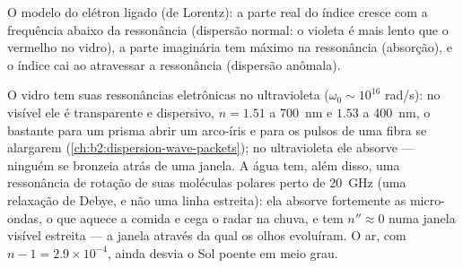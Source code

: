 \begin{omfigure}

{\small O modelo do elétron ligado (de Lorentz): a parte real do índice
cresce com a frequência abaixo da ressonância (dispersão normal: o violeta
é mais lento que o vermelho no vidro), a parte imaginária tem máximo na
ressonância (absorção), e o índice cai ao atravessar a ressonância
(dispersão anômala).}
\end{omfigure}

\begin{example}\label{ex:b2:waves-in-media:dielectrics}
O vidro tem suas ressonâncias eletrônicas no ultravioleta ($\omega_0 \sim 10^{16}$
rad/s): no visível ele é transparente e dispersivo, $n = 1.51$ a
\qty{700}{nm} e $1.53$ a \qty{400}{nm}, o bastante para um prisma abrir um
arco-íris e para os pulsos de uma fibra se alargarem (\cref{ch:b2:dispersion-wave-packets});
no ultravioleta ele absorve --- ninguém se bronzeia atrás de uma janela.
A água tem, além disso, uma ressonância de rotação de suas moléculas polares perto de
\qty{20}{GHz} (uma relaxação de Debye, e não uma linha estreita): ela absorve
fortemente as micro-ondas, o que aquece a comida e cega o radar na chuva,
e tem $n'' \approx 0$ numa janela visível estreita --- a janela através
da qual os olhos evoluíram. O ar, com $n - 1 = 2.9 \times 10^{-4}$, ainda desvia o
Sol poente em meio grau.
\end{example}

